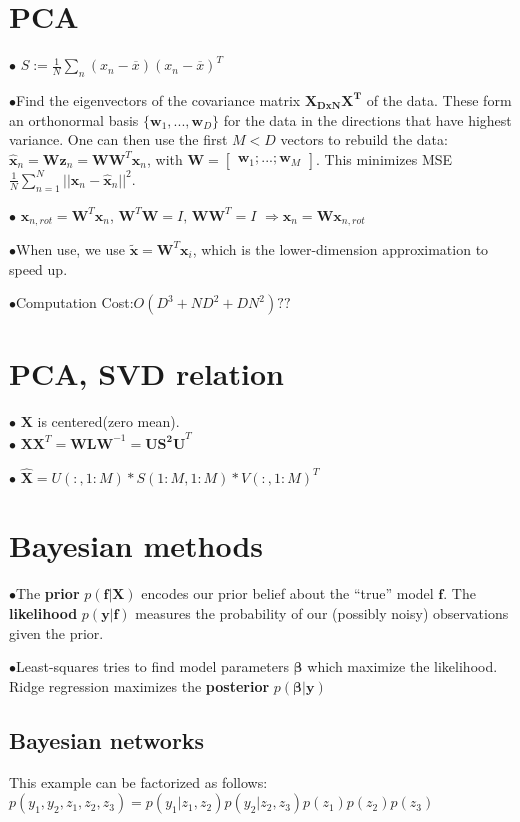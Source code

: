\documentclass[10pt,a4paper,landscape]{article}
\renewcommand{\bf}[1]{\ensuremath{\mathbf{#1}}}
\newcommand{\bbeta}{\boldsymbol\beta}
\begin{document}
\begin{multicols*}{6}
\section{PCA}
$\bullet$ $S:=\frac{1}{N}\sum_n(x_n-\overline{x})(x_n-\overline{x})^T$

$\bullet$Find the eigenvectors of the covariance matrix $\bf{X_{DxN} X^T}$ of the data. These form an orthonormal basis $\{ \bf{w}_1, ..., \bf{w}_D\}$ for the data in the directions that have highest variance.
One can then use the first $M < D$ vectors to rebuild the data: $\bf{\hat{x}}_n = \bf{W} \bf{z}_n = \bf{W} \bf{W}^T \bf{x}_n$, with $\bf{W} = \begin{bmatrix} \bf{w}_1 ; ... ; \bf{w}_M \end{bmatrix}$.
This minimizes MSE $\frac{1}{N} \sum_{n=1}^N ||\bf{x}_n - \bf{\hat{x}}_n||^2$.

$\bullet$ $\bf{x}_{n,rot} = \bf{W}^T\bf{x}_n$, $\bf{W}^T\bf{W}=I ,\, \bf{W}\bf{W}^T = I $
$\Rightarrow \bf{x}_n=\bf{W}\bf{x}_{n,rot}$

$\bullet$When use, we use $\tilde{\bf{x}} = \bf{W}^T \bf{x}_i$, which is the lower-dimension approximation to speed up.

$\bullet$Computation Cost:$O(D^3+ND^2+DN^2)??$

\section{PCA, SVD relation}
$\bullet$ $\bf{X}$ is centered(zero mean).\\
$\bullet$ $\bf{XX}^T = \bf{WLW}^{-1} = \bf{US^2U}^T$

$\bullet$ $\hat{\bf{X}}=U(:,1:M)*S(1:M,1:M)*V(:,1:M)^T$



\section{Bayesian methods}
$\bullet$The \textbf{prior} $p(\bf{f}|\bf{X})$ encodes our prior belief about the ``true'' model $\bf{f}$. The \textbf{likelihood} $p(\bf{y}|\bf{f})$ measures the probability of our (possibly noisy) observations given the prior.

$\bullet$Least-squares tries to find model parameters $\bbeta$ which maximize the likelihood. Ridge regression maximizes the \textbf{posterior} $p(\bbeta|\bf{y})$

\subsection{Bayesian networks}
This example can be factorized as follows:
$p(y_1, y_2, z_1, z_2, z_3) = p(y_1 | z_1, z_2) p(y_2 | z_2, z_3) p(z_1) p(z_2) p(z_3)$


\end{multicols*}
\end{document}
